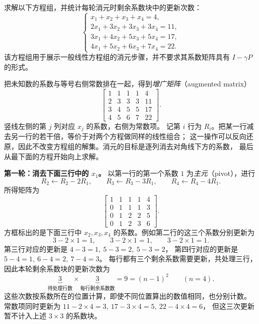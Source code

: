 \documentclass[UTF8,12pt,a4paper,fontset=fandol]{ctexart}
\begin{document}
\begin{example}
求解以下方程组，并统计每轮消元时剩余系数块中的更新次数：
\begin{equation}
  \begin{cases}
    x_1+x_2+x_3+x_4=4,\\
    2x_1+3x_2+3x_3+3x_4=11,\\
    3x_1+4x_2+5x_3+5x_4=17,\\
    4x_1+5x_2+6x_3+7x_4=22.
  \end{cases}
  \label{eq:four-variable-system}
\end{equation}
该方程组用于展示一般线性方程组的消元步骤，并不要求其系数矩阵具有 $I-\gamma P$ 的形式。
\end{example}

\begin{solve}
把未知数的系数与等号右侧常数排在一起，得到\emph{增广矩阵}（augmented matrix）
\[
  \left[
  \begin{array}{cccc|c}
    1&1&1&1&4\\
    2&3&3&3&11\\
    3&4&5&5&17\\
    4&5&6&7&22
  \end{array}
  \right].
\]
竖线左侧的第 $j$ 列对应 $x_j$ 的系数，右侧为常数项。
记第 $i$ 行为 $R_i$。把某一行减去另一行的若干倍，等价于对两个方程做同样的线性组合；
这一操作可以反向还原，因此不改变方程组的解集。消元的目标是逐列消去对角线下方的系数，
最后从最下面的方程开始向上求解。

\textbf{第一轮：消去下面三行中的 $x_1$。}
以第一行的第一个系数 $1$ 为\emph{主元}（pivot），进行
\[
  R_2\leftarrow R_2-2R_1,\qquad
  R_3\leftarrow R_3-3R_1,\qquad
  R_4\leftarrow R_4-4R_1.
\]
所得矩阵为
\begin{equation}
  \left[
  \begin{array}{cccc|c}
    1&1&1&1&4\\
    0&\boxed{1}&\boxed{1}&\boxed{1}&3\\
    0&\boxed{1}&\boxed{2}&\boxed{2}&5\\
    0&\boxed{1}&\boxed{2}&\boxed{3}&6
  \end{array}
  \right].
  \label{eq:elimination-first-round}
\end{equation}
方框标出的是下面三行中 $x_2,x_3,x_4$ 的系数。例如第二行的这三个系数分别更新为
\[
  3-2\times1=1,\qquad 3-2\times1=1,\qquad 3-2\times1=1.
\]
第三行对应的更新是 $4-3=1,\ 5-3=2,\ 5-3=2$，
第四行对应的更新是 $5-4=1,\ 6-4=2,\ 7-4=3$。
每行都有三个剩余系数需要更新，共处理三行，因此本轮剩余系数块的更新次数为
\[
  \underbrace{3}_{\text{待处理行数}}
  \times\underbrace{3}_{\text{每行剩余系数数}}
  =9=(n-1)^2\qquad(n=4).
\]
这些次数按系数所在的位置计算，即使不同位置算出的数值相同，也分别计数。
常数项同时更新为 $11-2\times4=3,\ 17-3\times4=5,\ 22-4\times4=6$，
但这三次更新暂不计入上述 $3\times3$ 的系数块。


\end{solve}
\end{document}
